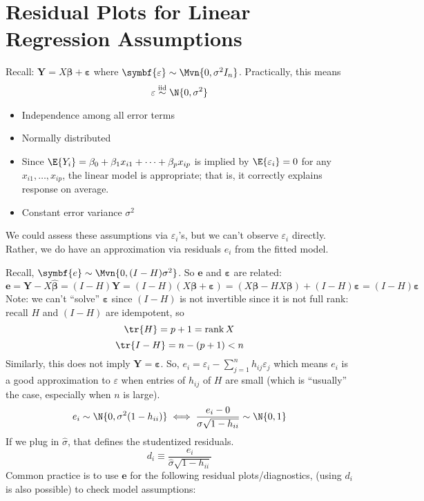 \section{Residual Plots for Linear Regression Assumptions}

Recall: $ \symbf{Y}=X \symbf{\beta}+\symbf{\varepsilon} $
where $ \symbf{\varepsilon}\sim \Mvn{0,\sigma^2I_{n}} $.
Practically, this means
\[ \varepsilon \stackrel{\text{iid}}{\sim}\N{0,\sigma^2} \]
\begin{itemize}
    \item Independence among all error terms
    \item Normally distributed
    \item Since $ \E{Y_i}=\beta_0+\beta_1x_{i1}+\cdots+\beta_p x_{ip} $
          is implied by $ \E{\varepsilon_i}=0 $ for any
          $ x_{i1},\ldots,x_{ip} $, the linear model
          is appropriate; that is, it correctly explains response
          on average.
    \item Constant error variance $ \sigma^2 $
\end{itemize}
We could assess these assumptions
via $ \varepsilon_i $'s, but we can't observe
$ \varepsilon_i $ directly. Rather, we do have an approximation
via residuals $ e_i $ from the fitted model.

Recall, $ \symbf{e}\sim \Mvn{0,(I-H)\sigma^2} $.
So $ \symbf{e} $ and $ \symbf{\varepsilon} $ are related:
\[ \symbf{e}=\symbf{Y}-X \hat{\symbf{\beta}}=(I-H)\symbf{Y}=
    (I-H)(X \symbf{\beta}+\symbf{\varepsilon})=
    (X \symbf{\beta}-H X\symbf{\beta})+(I-H)\symbf{\varepsilon}=
    (I-H)\symbf{\varepsilon} \]
Note: we can't ``solve'' $ \symbf{\varepsilon} $
since $ (I-H) $ is not invertible since it is not full rank:
recall $ H $ and $ (I-H) $ are idempotent, so
\[ \tr{H}=p+1=\rank{X} \]
\[ \tr{I-H}=n-(p+1)<n \]
Similarly, this does not imply $ \symbf{Y}=\symbf{\varepsilon} $.
So, $ e_i=\varepsilon_i-\sum_{j=1}^{n} h_{ij}\varepsilon_j $
which means $ e_i $ is a good approximation to $ \varepsilon $
when entries of $ h_{ij} $ of $ H $ are small
(which is ``usually'' the case, especially when $ n $ is large).
\[ e_i \sim \N{0,\sigma^2(1-h_{ii})}\iff
    \frac{e_i-0}{\sigma\sqrt{1-h_{ii}}} \sim \N{0,1} \]
If we plug in $ \hat{\sigma} $, that defines
the studentized residuals.
\[ d_i\equiv \frac{e_i}{\hat{\sigma}\sqrt{1-h_{ii}}}  \]
Common practice is to use $ \symbf{e} $ for
the following residual plots/diagnostics,
(using $ d_i $ is also possible) to check model assumptions:

